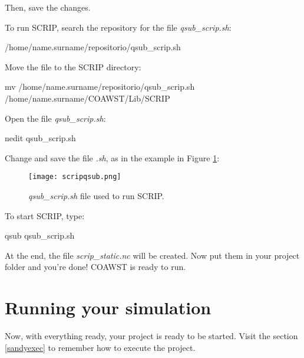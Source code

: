  Then, save the changes.
\bigskip

 To run SCRIP, search the repository for the file \textit{qsub\_scrip.sh}:
\bigskip

\begin{bashcode}
/home/name.surname/repositorio/qsub_scrip.sh
\end{bashcode}
\bigskip

 Move the file to the SCRIP directory:
\bigskip

\begin{bashcode}[fontsize=\scriptsize]
mv /home/name.surname/repositorio/qsub_scrip.sh /home/name.surname/COAWST/Lib/SCRIP
\end{bashcode}
\bigskip

 Open the file \textit{qsub\_scrip.sh}:
\bigskip

\begin{bashcode}
nedit qsub_scrip.sh
\end{bashcode}
\bigskip

 Change and save the file \textit{.sh}, as in the example in Figure \textcolor{bleu_cite}{\ref{qsubscripsh}}:
\bigskip

\begin{figure}[H]
    \centering
    \texttt{[image: scripqsub.png]}
    \caption{\textit{qsub\_scrip.sh} file used to run SCRIP.}
    \label{qsubscripsh}
\end{figure}
\bigskip

 To start SCRIP, type:
\bigskip

\begin{bashcode}
qsub qsub_scrip.sh
\end{bashcode}
\bigskip

 At the end, the file \textit{scrip\_static.nc} will be created. Now put them in your project folder and you're done! COAWST is ready to run.
\bigskip

\section{Running your simulation}{{{{ }}}}
\bigskip

 Now, with everything ready, your project is ready to be started. Visit the section \textcolor{bleu_cite}{\ref{sandyexec}} to remember 
how to execute the project.